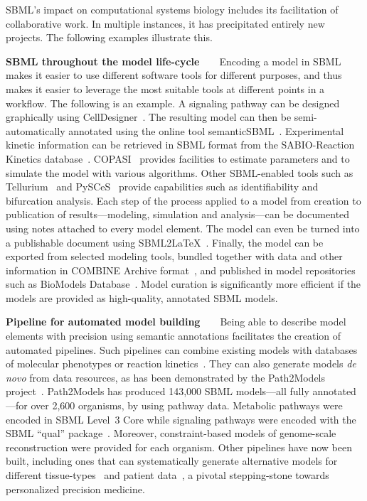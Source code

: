 \documentclass[]{draft-sbml-paper}
\begin{document}
SBML's impact on computational systems biology includes its facilitation of collaborative work.  In multiple instances, it has precipitated entirely new projects.  The following examples illustrate this.

\textbf{SBML throughout the model life-cycle}~~~~Encoding a model in SBML makes it easier to use different software tools for different purposes, and thus makes it easier to leverage the most suitable tools at different points in a workflow.  The following is an example.  A signaling pathway can be designed graphically using CellDesigner~\citep{Funahashi2003celldesignera, Matsuoka2014modeling}. The resulting model can then be semi-automatically annotated using the online tool semanticSBML~\citep{krause2010annotation}. Experimental kinetic information can be retrieved in SBML format from the SABIO-Reaction Kinetics database~\citep{wittig2017sabio}. COPASI~\citep{hoops2006copasi} provides facilities to estimate parameters and to simulate the model with various algorithms. Other SBML-enabled tools such as Tellurium~\citep{Medley2018tellurium, Choi2018tellurium} and PySCeS~\citep{olivier2005modelling} provide capabilities such as identifiability and bifurcation analysis. Each step of the process applied to a model from creation to publication of results---modeling, simulation and analysis---can be documented using notes attached to every model element. The model can even be turned into a publishable document using SBML2\LaTeX~\citep{Draeger2009b}.  Finally, the model can be exported from selected modeling tools, bundled together with data and other information in COMBINE Archive format~\citep{bergmann2014combine}, and published in model repositories such as BioModels Database~\citep{chelliah2014biomodels, li2010biomodels}.  Model curation is significantly more efficient if the models are provided as high-quality, annotated SBML models.

\textbf{Pipeline for automated model building}~~~~Being able to describe model elements with precision using semantic annotations facilitates the creation of automated pipelines. Such pipelines can combine existing models with databases of molecular phenotypes or reaction kinetics~\citep{li2010systematic}.  They can also generate models \emph{de novo} from data resources, as has been demonstrated by the Path2Models project~\citep{buchel2013path2models}. Path2Models has produced 143,000 SBML models---all fully annotated---for over 2,600 organisms, by using pathway data. Metabolic pathways were encoded in SBML Level~3 Core while signaling pathways were encoded with the SBML ``qual'' package~\citep{chaouiya2013sbml}. Moreover, constraint-based models of genome-scale reconstruction were provided for each organism. Other pipelines have now been built, including ones that can systematically generate alternative models for different tissue-types~\citep{wang2012reconstruction,thiele2013community} and patient data~\citep{uhlen2017pathology}, a pivotal stepping-stone towards personalized precision medicine.
\end{document}
